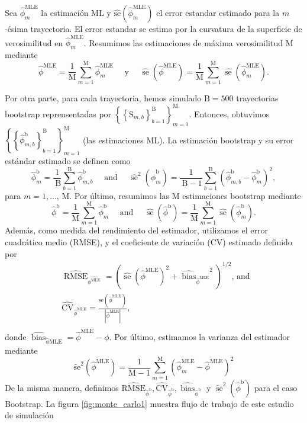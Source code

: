 Sea $\hat{\phi}_m^{\mathrm{MLE}}$ la estimación ML y $\widehat{\mathrm{se}}\left(\hat{\phi}_m^{\mathrm{MLE}}\right)$ el error estandar estimado para la  $m$-ésima trayectoria.
El error estandar se estima por la curvatura de la superficie de verosimilitud en $\hat{\phi}_m^{\mathrm{MLE}}$. 
Resumimos las estimaciones de máxima verosimilitud M mediante
$$
\hat{\phi}^{\mathrm{MLE}}=\frac{1}{\mathrm{M}} \sum_{m=1}^{\mathrm{M}} \hat{\phi}_m^{\mathrm{MLE}} \quad \text { y } \quad \widehat{\operatorname{se}}\left(\hat{\phi}^{\mathrm{MLE}}\right)=\frac{1}{\mathrm{M}} \sum_{m=1}^{\mathrm{M}} \widehat{\operatorname{se}}\left(\hat{\phi}_m^{\mathrm{MLE}}\right) .
$$

Por otra parte, para cada trayectoria, hemos simulado $\mathrm{B}=500$ trayectorias bootstrap reprensentadas por $\left\{\left\{\mathrm{S}_{m, b}\right\}_{b=1}^{\mathrm{B}}\right\}_{m=1}^{\mathrm{M}}$. Entonces, obtuvimos $\left\{\left\{\hat{\phi}_{m, b}^{\mathrm{b}}\right\}_{b=1}^{\mathrm{B}}\right\}_{m=1}^{\mathrm{M}}$ 
(las estimaciones ML). La estimación bootstrap y su error estándar estimado se definen como
$$
\hat{\phi}_m^{\mathrm{b}}=\frac{1}{\mathrm{~B}} \sum_{b=1}^{\mathrm{B}} \hat{\phi}_{m, b}^{\mathrm{b}} \quad \text { and } \quad \widehat{\operatorname{se}}^2\left(\hat{\phi}_m^{\mathrm{b}}\right)=\frac{1}{\mathrm{~B}-1} \sum_{b=1}^{\mathrm{B}}\left(\hat{\phi}_{m, b}^{\mathrm{b}}-\hat{\phi}_m^{\mathrm{b}}\right)^2,
$$
para $m=1, \ldots$, M. Por último, resumimos las M estimaciones bootstrap mediante
$$
\hat{\phi}^{\mathrm{b}}=\frac{1}{\mathrm{M}} \sum_{m=1}^{\mathrm{M}} \hat{\phi}_m^{\mathrm{b}} \quad \text { and } \quad \widehat{\operatorname{se}}\left(\hat{\phi}^{\mathrm{b}}\right)=\frac{1}{\mathrm{M}} \sum_{m=1}^{\mathrm{M}} \widehat{\operatorname{se}}\left(\hat{\phi}_m^{\mathrm{b}}\right) .
$$
Además, como medida del rendimiento del estimador, utilizamos el error cuadrático medio (RMSE), y el coeficiente de variación (CV) estimado definido por
$$
\begin{aligned}
& \widehat{\operatorname{RMSE}}_{\hat{\phi^{\mathrm{MLE}}}}=\left(\widehat{\operatorname{se}}\left(\hat{\phi}^{\mathrm{MLE}}\right)^2+{\widehat{\operatorname{bias}}_{{\hat{\phi}}^{\mathrm{MLE}}}}^2\right)^{1 / 2} \text {, and } \\
& \widehat{\mathrm{CV}}_{\hat{\phi}^{\mathrm{MLE}}}=\frac{\widehat{\mathrm{se}}\left(\hat{\phi}^{\mathrm{MLE}}\right)}{\left|\hat{\phi}^{\mathrm{MLE}}\right|}, \\
&
\end{aligned}
$$
donde $\widehat{\operatorname{bias}}_{\hat{\phi} \mathrm{MLE}}=\hat{\phi}^{\mathrm{MLE}}-\phi$. Por último, estimamos la varianza del estimador mediante
$$
\widetilde{\mathrm{se}}^2\left(\hat{\phi}^{\mathrm{MLE}}\right)=\frac{1}{\mathrm{M}-1} \sum_{m=1}^{\mathrm{M}}\left(\hat{\phi}_m^{\mathrm{MLE}}-\hat{\phi}^{\mathrm{MLE}}\right)^2
$$
De la misma manera, definimos $\widehat{\mathrm{RMSE}}_{\hat{\phi}^{\mathrm{b}}}, \widehat{\mathrm{CV}}_{\hat{\phi}^{\mathrm{b}}}, \widehat{\operatorname{bias}}_{\hat{\phi}^{\mathrm{b}}}$ y $\widetilde{\operatorname{se}}^2\left(\hat{\phi}^{\mathrm{b}}\right)$ para el caso Bootstrap. La figura \ref{fig:monte_carlo1} muestra flujo de trabajo de este estudio de simulación

